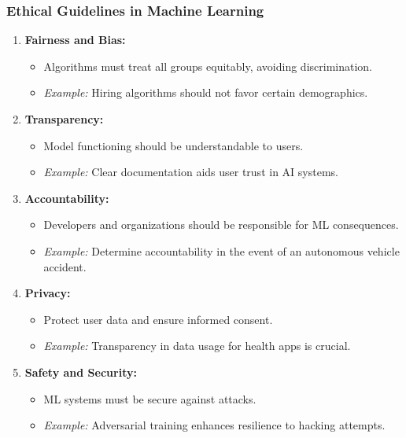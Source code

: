 \documentclass[aspectratio=169]{beamer}
\begin{document}
\begin{frame}[fragile]
    \frametitle{Ethical Guidelines in Machine Learning}
    \begin{enumerate}
        \item \textbf{Fairness and Bias:}
            \begin{itemize}
                \item Algorithms must treat all groups equitably, avoiding discrimination.
                \item \textit{Example:} Hiring algorithms should not favor certain demographics.
            \end{itemize}
        \item \textbf{Transparency:}
            \begin{itemize}
                \item Model functioning should be understandable to users.
                \item \textit{Example:} Clear documentation aids user trust in AI systems.
            \end{itemize}
        \item \textbf{Accountability:}
            \begin{itemize}
                \item Developers and organizations should be responsible for ML consequences.
                \item \textit{Example:} Determine accountability in the event of an autonomous vehicle accident.
            \end{itemize}
        \item \textbf{Privacy:}
            \begin{itemize}
                \item Protect user data and ensure informed consent.
                \item \textit{Example:} Transparency in data usage for health apps is crucial.
            \end{itemize}
        \item \textbf{Safety and Security:}
            \begin{itemize}
                \item ML systems must be secure against attacks.
                \item \textit{Example:} Adversarial training enhances resilience to hacking attempts.
            \end{itemize}
    \end{enumerate}
\end{frame}
\end{document}
